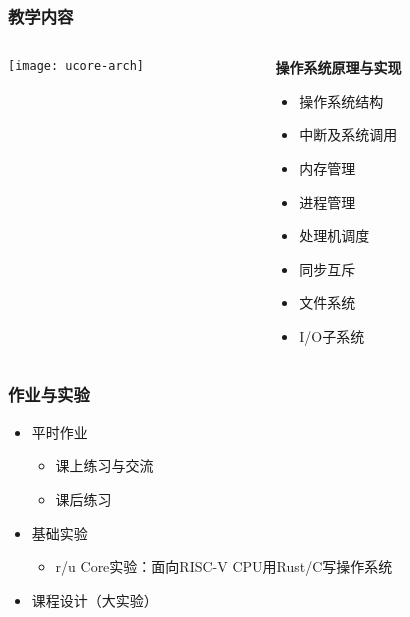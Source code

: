 \begin{frame}
	\frametitle{教学内容}

	\begin{columns}

	\begin{column}{0.5\textwidth}
	
    \texttt{[image: ucore-arch]}
    
    \end{column}
	
	\begin{column}{0.5\textwidth}
	\textbf{操作系统原理与实现}
    \begin{itemize}
		\item 操作系统结构
		\item 中断及系统调用 \pause
		\item 内存管理
		\item 进程管理
		\item 处理机调度
		\item 同步互斥 \pause
		\item 文件系统
		\item I/O子系统
    \end{itemize}
    
    \end{column}

\end{columns}

\end{frame}


    \begin{frame}
        \frametitle{作业与实验}
        \begin{itemize}
            \item 平时作业
        \begin{itemize}
    		\item 课上练习与交流
	    	\item 课后练习
        \end{itemize} \pause

            \item 基础实验
    \begin{itemize}
		\item r/u Core实验：面向RISC-V CPU用Rust/C写操作系统
    \end{itemize}
            \item 课程设计（大实验）
        \end{itemize}
\end{frame}

